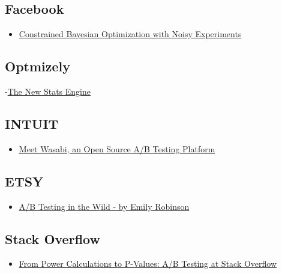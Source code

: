 \documentclass[]{book}
\providecommand{\tightlist}{%
  \setlength{\itemsep}{0pt}\setlength{\parskip}{0pt}}
\theoremstyle{definition}
\theoremstyle{definition}
\theoremstyle{definition}
\theoremstyle{remark}
\begin{document}
\subsection{Facebook}\label{facebook}

\begin{itemize}
\tightlist
\item
  \href{https://arxiv.org/abs/1706.07094}{Constrained Bayesian
  Optimization with Noisy Experiments}
\end{itemize}

\subsection{Optmizely}\label{optmizely}

-\href{http://pages.optimizely.com/rs/optimizely/images/stats_engine_technical_paper.pdf}{The
New Stats Engine}

\subsection{INTUIT}\label{intuit}

\begin{itemize}
\tightlist
\item
  \href{https://medium.com/blueprint-by-intuit/open-sourcing-wasabi-the-a-b-testing-platform-by-intuit-a8d5abc958d}{Meet
  Wasabi, an Open Source A/B Testing Platform}
\end{itemize}

\subsection{ETSY}\label{etsy}

\begin{itemize}
\tightlist
\item
  \href{https://www.youtube.com/watch?v=lvXUvRdr2lo\&feature=youtu.be}{A/B
  Testing in the Wild - by Emily Robinson}
\end{itemize}

\subsection{Stack Overflow}\label{stack-overflow}

\begin{itemize}
\tightlist
\item
  \href{https://stackoverflow.blog/2017/10/17/power-calculations-p-values-ab-testing-stack-overflow/}{From
  Power Calculations to P-Values: A/B Testing at Stack Overflow}
\end{itemize}
\end{document}
